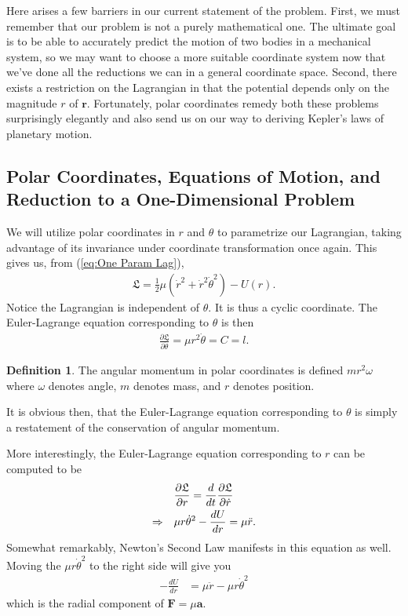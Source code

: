 \documentclass[10pt, psamsfonts]{amsart}
\theoremstyle{definition}
\newtheorem{defn}[thm]{Definition}
\theoremstyle{remark}
\numberwithin{equation}{section}
\begin{document}
Here arises a few barriers in our current statement of the problem. First, we must remember that our problem is not a purely mathematical one. The ultimate goal is to be able to accurately predict the motion of two bodies in a mechanical system, so we may want to choose a more suitable coordinate system now that we've done all the reductions we can in a general coordinate space. Second, there exists a restriction on the Lagrangian in that the potential depends only on the magnitude $r$ of $\bm{r}$. Fortunately, polar coordinates remedy both these problems surprisingly elegantly and also send us on our way to deriving Kepler's laws of planetary motion.

\subsection{Polar Coordinates, Equations of Motion, and Reduction to a One-Dimensional Problem} We will utilize polar coordinates in $r$ and $\theta$ to parametrize our Lagrangian, taking advantage of its invariance under coordinate transformation once again. This gives us, from (\ref{eq:One Param Lag}),
\begin{align*}
  \mathfrak{L} = \frac{1}{2} \mu (\dot{r}^2 +\dot{r}^2 \dot{\theta}^2) - U(r).
\end{align*}
Notice the Lagrangian is independent of $\theta$. It is thus a cyclic coordinate. The Euler-Lagrange equation corresponding to $\theta$ is then
\begin{align}
  \label{eq: Theta Eq}
  \frac{\partial \mathfrak{L}}{\partial \dot{\theta}} = \mu r^2 \dot{\theta} = C = l.
\end{align}
\begin{defn}
The angular momentum in polar coordinates is defined $m r^2 \omega$ where $\omega$ denotes angle, $m$ denotes mass, and $r$ denotes position.
\end{defn}
It is obvious then, that the Euler-Lagrange equation corresponding to $\theta$ is simply a restatement of the conservation of angular momentum.

More interestingly, the Euler-Lagrange equation corresponding to $r$ can be computed to be
\begin{align}
  \label{eq: Radial Eq}
  &\frac{\partial \mathfrak{L}}{\partial r} = \frac{d}{dt} \frac{\partial \mathfrak{L}}{\partial \dot{r}} \notag \\
  \Rightarrow\quad& \mu r \dot{\theta}^2 - \frac{dU}{dr} = \mu \ddot{r}.
\end{align}
Somewhat remarkably, Newton's Second Law manifests in this equation as well. Moving the $\mu r \dot{\theta}^2$ to the right side will give you
\begin{align*}
  - \frac{dU}{dr} &= \mu \ddot{r} - \mu r \dot{\theta}^2
\end{align*}
which is the radial component of $\bm{F} = \mu \bm{a}$.
\end{document}
